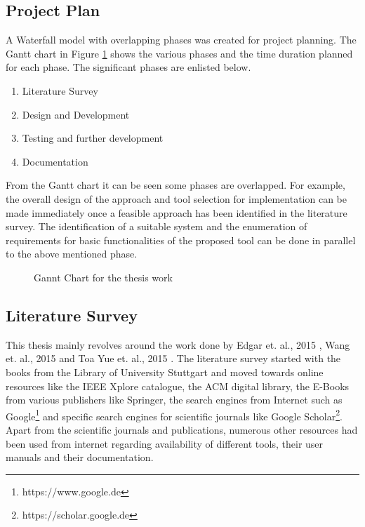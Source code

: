 \subsection{Project Plan}
A Waterfall model with overlapping phases was created for project planning. The Gantt chart in Figure \ref{fig:gc} shows the various phases and the time duration planned for each phase. 
The significant phases are enlisted below.
\begin{enumerate}
\item Literature Survey
\item Design and Development
\item Testing and further development
\item Documentation
\end{enumerate}
From the Gantt chart it can be seen some phases are overlapped. For example, the overall design of the approach and tool selection for implementation can be made immediately once a feasible approach has been identified in the literature survey. The identification of a suitable system and the enumeration of requirements for basic functionalities of the proposed tool can be done in parallel to the above mentioned phase.
\begin{figure}[htb!]
\centering
{}
\caption{Gannt Chart for the thesis work}
\label{fig:gc}
\end{figure}
\subsection{Literature Survey}
This thesis mainly revolves around the work done by Edgar et. al., 2015 \cite{sarmiento2015mapping}, Wang et. al., 2015 \cite{wang2015automatic} and Toa Yue et. al., 2015 \cite{yue2015rtcm}. The literature survey started with the books from the Library of University Stuttgart and moved towards online resources like the IEEE Xplore catalogue, the ACM digital library, the E-Books from various publishers like Springer, the search engines from Internet such as Google\footnote{https://www.google.de} and specific search engines for scientific journals like Google Scholar\footnote{https://scholar.google.de}. Apart from the scientific journals and publications, numerous other resources had been used from internet regarding availability of different tools, their user manuals and their documentation.
